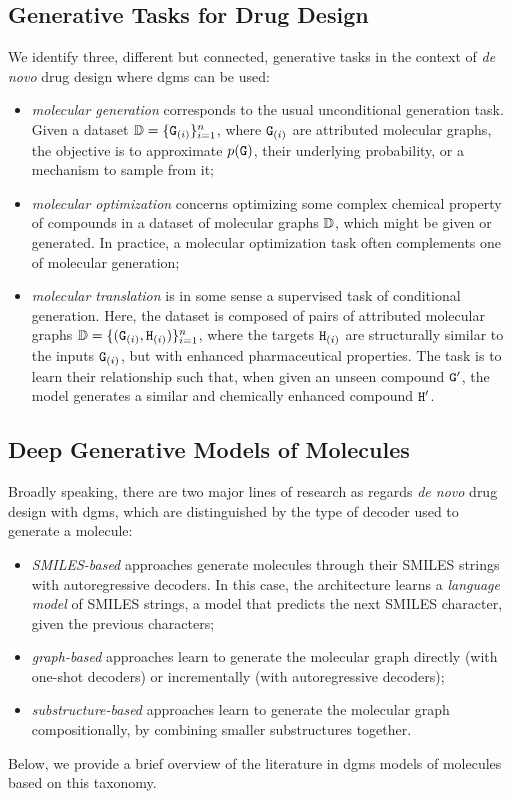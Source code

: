 \subsection{Generative Tasks for Drug Design}
We identify three, different but connected, generative tasks in the context of \emph{de novo} drug design where \glspl{dgm} can be used:
\begin{itemize}
    \item \emph{molecular generation} corresponds to the usual unconditional generation task. Given a dataset $\Data = \{\PatternGraph{g}{i}\}_{i=1}^n$, where $\PatternGraph{g}{i}$ are attributed molecular graphs, the objective is to approximate $p(\mathtt{G})$, their underlying probability, or a mechanism to sample from it;
    \item \emph{molecular optimization} concerns optimizing some complex chemical property of compounds in a dataset of molecular graphs $\mathbb{D}$, which might be given or generated. In practice, a molecular optimization task often complements one of molecular generation;
    \item \emph{molecular translation} is in some sense a supervised task of conditional generation. Here, the dataset is composed of pairs of attributed molecular graphs $\Data = \{(\PatternGraph{g}{i}, \PatternGraph{h}{i})\}_{i=1}^n$, where the targets $\PatternGraph{h}{i}$ are structurally similar to the inputs $\PatternGraph{g}{i}$, but with enhanced pharmaceutical properties. The task is to learn their relationship such that, when given an unseen compound $\mathtt{G'}$, the model generates a similar and chemically enhanced compound $\mathtt{H'}$.
\end{itemize}

\subsection{Deep Generative Models of Molecules} \label{sec:review}
Broadly speaking, there are two major lines of research as regards \emph{de novo} drug design with \glspl{dgm}, which are distinguished by the type of decoder used to generate a molecule:
\begin{itemize}
    \item \emph{SMILES-based} approaches generate molecules through their SMILES strings with autoregressive decoders. In this case, the architecture learns a \emph{language model} of SMILES strings, \ie a model that predicts the next SMILES character, given the previous characters;
    \item \emph{graph-based} approaches learn to generate the molecular graph directly (with one-shot decoders) or incrementally (with autoregressive decoders);
    \item \emph{substructure-based} approaches learn to generate the molecular graph compositionally, by combining smaller substructures together.
\end{itemize}
Below, we provide a brief overview of the literature in \glspl{dgm} models of molecules based on this taxonomy.

